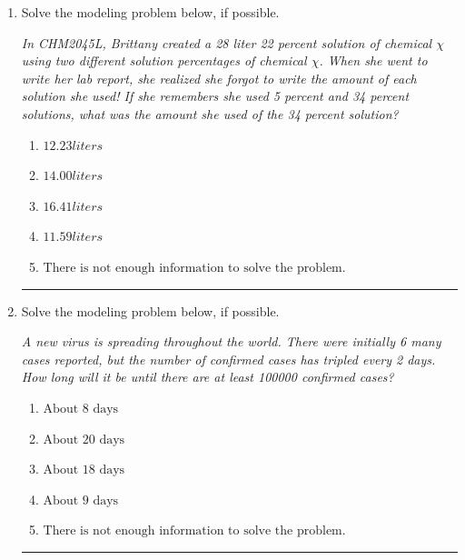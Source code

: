 \documentclass[14pt]{extbook}
\newcommand{\litem}[1]{\item#1\hspace*{-1cm}\rule{\textwidth}{0.4pt}}
\begin{document}
\begin{enumerate}
{\begin{enumerate}[label=\Alph*.]
\end{enumerate} }
\litem{
Solve the modeling problem below, if possible.
\begin{center}
    \textit{ In CHM2045L, Brittany created a 28 liter 22 percent solution of chemical $\chi$ using two different solution percentages of chemical $\chi$. When she went to write her lab report, she realized she forgot to write the amount of each solution she used! If she remembers she used 5 percent and 34 percent solutions, what was the amount she used of the 34 percent solution? }
\end{center}
\begin{enumerate}[label=\Alph*.]
\item \( 12.23 liters \)
\item \( 14.00 liters \)
\item \( 16.41 liters \)
\item \( 11.59 liters \)
\item \( \text{There is not enough information to solve the problem.} \)

\end{enumerate} }
\litem{
Solve the modeling problem below, if possible.
\begin{center}
    \textit{ A new virus is spreading throughout the world. There were initially 6 many cases reported, but the number of confirmed cases has tripled every 2 days. How long will it be until there are at least 100000 confirmed cases? }
\end{center}
\begin{enumerate}[label=\Alph*.]
\item \( \text{About } 8 \text{ days} \)
\item \( \text{About } 20 \text{ days} \)
\item \( \text{About } 18 \text{ days} \)
\item \( \text{About } 9 \text{ days} \)
\item \( \text{There is not enough information to solve the problem.} \)


\end{enumerate}}
\end{enumerate}
\end{document}
